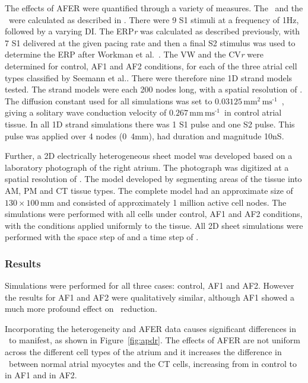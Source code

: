 The effects of AFER were quantified through a variety of measures.  The
\apdr\ and the \apdr[50]\ were calculated
as described in .  There were 9 S1 stimuli at a frequency of
\unit{1}{Hz}, followed by a varying DI.  The ERP\emph{r}
was calculated as described previously, with 7 S1 delivered at the given pacing
rate and then a final S2 stimulus was used to determine the ERP after Workman et
al.~\cite{Workman2001}.  The VW and the CV\emph{r} were determined for control,
AF1 and AF2 conditions, for each of the three atrial cell types classified by
Seemann et al.. There were therefore nine 1D strand models tested.  The strand
models were each 200 nodes long, with a spatial resolution of .  The
diffusion constant used for all simulations was set to
$0.03125\,\text{mm}^{\text{2}}\,\text{ms}^{\text{-1}}$~\cite{Biktasheva2005},
giving a solitary wave conduction velocity of
$0.267\,\text{mm}\,\text{ms}^{\text{-1}}$\ in control atrial tissue.  In all 1D
strand simulations there was 1 S1 pulse and one S2 pulse.  This pulse was
applied over 4 nodes (\unit{0.4}{mm}), had duration  and magnitude
\unit{10}{nS}.

Further, a 2D electrically heterogeneous sheet model was developed based on a
laboratory photograph of the right atrium.  The photograph was digitized at a
spatial resolution of . The model developed by segmenting areas of the
tissue into AM, PM and CT tissue types.  The complete model had an approximate size of
$130\times100\,\text{mm}$ and consisted of approximately 1 million active cell nodes.  The
simulations were performed with all cells under control, AF1 and AF2 conditions,
with the conditions applied uniformly to the tissue.  All 2D sheet simulations
were performed with the space step of  and a time step of .

\subsubsection{Results}

Simulations were performed for all three cases: control, AF1 and AF2.
However the results for AF1 and AF2 were qualitatively similar, although
AF1 showed a much more profound effect on \apd\ reduction.

Incorporating the heterogeneity and AFER data causes significant
differences in \apd\ to manifest, as shown in Figure~\ref{fig:apdr}. The
effects of AFER are not uniform across the different cell types of the
atrium and it increases the difference in \apd\ between normal atrial
myocytes and the CT cells, increasing from  in control to 
in AF1 and  in AF2.

